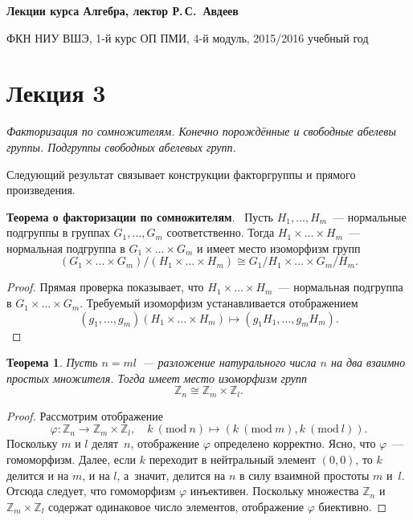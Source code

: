 \documentclass[a4paper,10pt]{amsart}
\def\ZZ{{\mathbb Z}}%
\newtheorem{theorem}{Теорема}
\theoremstyle{definition}
\theoremstyle{remark}
\begin{document}
%
\sloppy
%
\centerline{\large \bf Лекции курса \guillemotleft
Алгебра\guillemotright{}, лектор Р.\,С.~Авдеев}

\smallskip

\centerline{\large ФКН НИУ ВШЭ, 1-й курс ОП ПМИ, 4-й модуль,
2015/2016 учебный год}


\bigskip

\section*{Лекция 3}

\medskip

{\it Факторизация по
сомножителям. Конечно порождённые и свободные абелевы группы. Подгруппы
свободных абелевых групп.}

\medskip

Следующий результат связывает конструкции факторгруппы и прямого
произведения.

{\bf Теорема о факторизации по сомножителям}. \ Пусть $H_1, \ldots,
H_m$~--- нормальные подгруппы в группах $G_1, \ldots, G_m$
соответственно. Тогда $H_1 \times \ldots \times H_m$~--- нормальная
подгруппа в $G_1 \times \ldots \times G_m$ и имеет место изоморфизм
групп
$$
(G_1 \times \ldots \times G_m) / (H_1 \times \ldots \times H_m)
\cong G_1 / H_1 \times \ldots \times G_m / H_m.
$$

\begin{proof}
Прямая проверка показывает, что $H_1\times\ldots\times H_m$~---
нормальная подгруппа в $G_1\times\ldots\times G_m$. Требуемый
изоморфизм устанавливается отображением
$$
(g_1,\ldots,g_m)(H_1\times\ldots\times H_m)\mapsto
(g_1H_1,\ldots,g_mH_m).
$$
\end{proof}

\begin{theorem}
Пусть $n=ml$~--- разложение натурального числа $n$ на два взаимно
простых множителя. Тогда имеет место изоморфизм групп
$$
\ZZ_n\cong \ZZ_m\times\ZZ_l.
$$
\end{theorem}

\begin{proof}
Рассмотрим отображение
$$
\varphi\colon \ZZ_n\to \ZZ_m\times\ZZ_l, \quad k \ (\text{mod}\ n)
\mapsto (k\ (\text{mod}\ m), k\ (\text{mod}\  l)).
$$
Поскольку $m$ и $l$ делят~$n$, отображение $\varphi$ определено
корректно. Ясно, что $\varphi$~--- гомоморфизм. Далее, если $k$
переходит в нейтральный элемент $(0,0)$, то $k$ делится и на $m$, и
на $l$, а~значит, делится на $n$ в силу взаимной простоты $m$ и~$l$.
Отсюда следует, что гомоморфизм $\varphi$ инъективен. Поскольку
множества $\ZZ_n$ и $\ZZ_m\times\ZZ_l$ содержат одинаковое число
элементов, отображение $\varphi$ биективно.
\end{proof}
\end{document}
